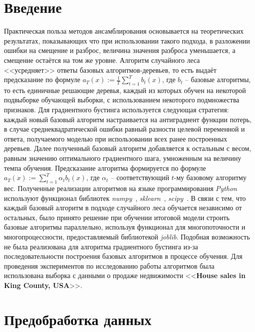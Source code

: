 \documentclass[a4paper, 14pt]{article}
\begin{document}
\section{Введение}
    Практическая польза методов ансамблирования основывается на теоретических результатах, показывающих что при использовании такого подхода, в разложении ошибки на смещение и разброс, величина значения разброса уменьшается, а смещение остаётся на том же уровне. Алгоритм случайного леса <<усредняет>> ответы базовых алгоритмов-деревьев, то есть выдаёт предсказание по формуле $a_T(x) := \frac{1}{T}\sum\limits_{t=1}^Tb_t(x)$, где $b_t$ -- базовые алгоритмы, то есть единичные решающие деревья, каждый из которых обучен на некоторой подвыборке обучающей выборки, с использованием некоторого подмножества признаков. Для градиентного бустинга используется следующая стратегия: каждый новый базовый алгоритм настраивается на антиградиент функции потерь, в случае среднеквадратической ошибки равный разности целевой переменной и ответа, получаемого моделью при использовании всех ранее построенных деревьев. Далее полученный базовый алгоритм добавляется к остальным с весом, равным значению оптимального градиентного шага, умноженным на величину темпа обучения. Предсказание алгоритма формируется по формуле $a_T(x) := \sum\limits_{t=1}^T\alpha_tb_t(x)$, где $\alpha_t$ -- соответствующий $t$-му базовому алгоритму вес. Полученные реализации алгоритмов на языке программирования \textit{Python} используют функционал библиотек \textit{numpy}~\cite{harris2020array}, \textit{sklearn}~\cite{scikit-learn}, \textit{scipy}~\cite{2020SciPy-NMeth}. В связи с тем, что каждый базовый алгоритм в подходе случайного леса обучается независимо от остальных, было принято решение при обучении итоговой модели строить базовые алгоритмы параллельно, используя функционал для многопоточности и многопроцессности, предоставляемый библиотекой \textit{joblib}\cite{joblib}. Подобная возможность не была реализована для алгоритма градиентного бустинга из-за последовательности построения базовых алгоритмов в процессе обучения. Для проведения экспериментов по исследованию работы алгоритмов была использована выборка с данными о продаже недвижимости <<\textbf{House sales in King County, USA}>>.

\section{Предобработка данных}
\end{document}
